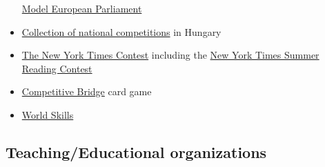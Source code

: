 \documentclass{article}
\begin{document}
\begin{itemize}
    \href{https://mepeurope.eu/}{Model European Parliament}
    \item \href{https://tanulmanyiversenyek.hu/}{Collection of national competitions} in Hungary
    \item \href{https://www.nytimes.com/spotlight/learning-contests}{The New York Times Contest} including the \href{https://www.nytimes.com/2021/04/16/learning/our-12th-annual-summer-reading-contest.html}{New York Times Summer Reading Contest}
    \item \href{http://youth.worldbridge.org/}{Competitive Bridge} card game
    \item \href{https://worldskills.org/}{World Skills}
\end{itemize}

\subsection{Teaching/Educational organizations}
\end{document}
